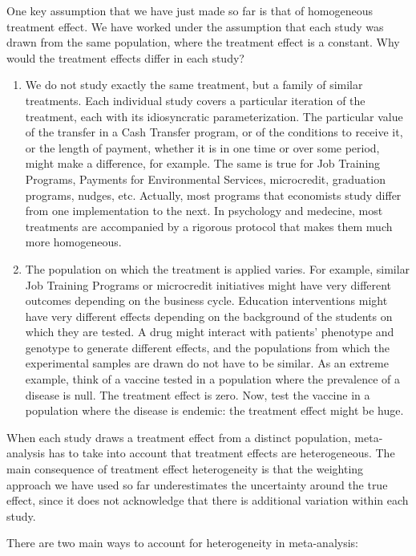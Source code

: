 \documentclass[]{book}
\providecommand{\tightlist}{%
  \setlength{\itemsep}{0pt}\setlength{\parskip}{0pt}}
\theoremstyle{definition}
\theoremstyle{definition}
\theoremstyle{definition}
\theoremstyle{remark}
\begin{document}
One key assumption that we have just made so far is that of homogeneous treatment effect.
We have worked under the assumption that each study was drawn from the same population, where the treatment effect is a constant.
Why would the treatment effects differ in each study?

\begin{enumerate}
\def\labelenumi{\arabic{enumi}.}
\tightlist
\item
  We do not study exactly the same treatment, but a family of similar treatments.
  Each individual study covers a particular iteration of the treatment, each with its idiosyncratic parameterization.
  The particular value of the transfer in a Cash Transfer program, or of the conditions to receive it, or the length of payment, whether it is in one time or over some period, might make a difference, for example.
  The same is true for Job Training Programs, Payments for Environmental Services, microcredit, graduation programs, nudges, etc.
  Actually, most programs that economists study differ from one implementation to the next.
  In psychology and medecine, most treatments are accompanied by a rigorous protocol that makes them much more homogeneous.
\item
  The population on which the treatment is applied varies.
  For example, similar Job Training Programs or microcredit initiatives might have very different outcomes depending on the business cycle.
  Education interventions might have very different effects depending on the background of the students on which they are tested.
  A drug might interact with patients' phenotype and genotype to generate different effects, and the populations from which the experimental samples are drawn do not have to be similar.
  As an extreme example, think of a vaccine tested in a population where the prevalence of a disease is null.
  The treatment effect is zero.
  Now, test the vaccine in a population where the disease is endemic: the treatment effect might be huge.
\end{enumerate}

When each study draws a treatment effect from a distinct population, meta-analysis has to take into account that treatment effects are heterogeneous.
The main consequence of treatment effect heterogeneity is that the weighting approach we have used so far underestimates the uncertainty around the true effect, since it does not acknowledge that there is additional variation within each study.

There are two main ways to account for heterogeneity in meta-analysis:
\end{document}

